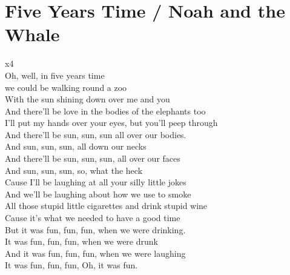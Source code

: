 \section{Five Years Time / Noah and the Whale}\label{ch:fiveyearstime}
\Cmajor
\Fmajor
\Gmajor


               x4\\
Oh, well, in  five years  time\\
we could be  walking round a  zoo\\
With the  sun shining  down over  me and  you\\
And there'll be  love in the  bodies of the  elephants  too\\
I'll put my  hands over  your eyes, but  you'll peep  through\\
And there'll be  sun, sun,  sun  all over our  bodies.\\
And  sun, sun,  sun,  all down our  necks\\
And there'll be  sun, sun,  sun,  all over our  faces\\
And  sun, sun,  sun,  so, what the  heck\\
Cause I'll be  laughing at  all your  silly little  jokes\\
And we'll  be laughing about  how we  use to  smoke\\
All those  stupid little  cigarettes and  drink stupid  wine\\
Cause it's  what we  needed to  have a good  time\\
But it was  fun, fun,  fun,  when we were  drinking.\\
It was  fun, fun,  fun,  when we were  drunk\\
And it was  fun, fun,  fun,  when we were  laughing\\
It was  fun, fun,  fun,  Oh, it was  fun.\\
